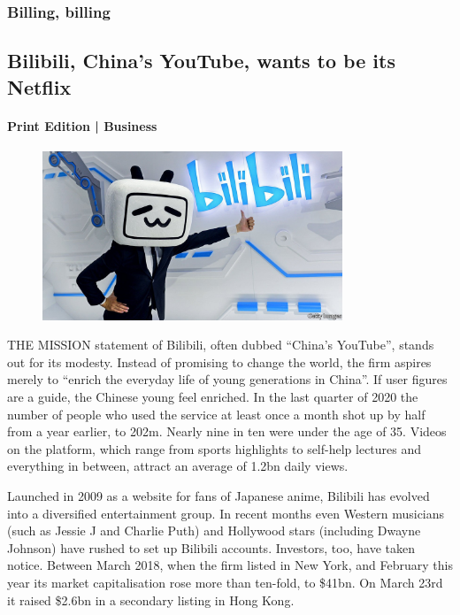 \documentclass{article}
\begin{document}
\subsubsection{Billing, billing }
\subsection{Bilibili, China's YouTube, wants to be its Netflix }
\paragraph{Print Edition | Business  \quad \color{gray}{Mar 25th 2021 }}
\begin{figure}[h]
\centering
\includegraphics[width=0.8\textwidth]{images/20210327_wbp502.jpg}
\end{figure}
\lettrine{T}HE MISSION statement of Bilibili, often dubbed ``China's YouTube'', stands out for its modesty. Instead of promising to change the world, the firm aspires merely to ``enrich the everyday life of young generations in China''. If user figures are a guide, the Chinese young feel enriched. In the last quarter of 2020 the number of people who used the service at least once a month shot up by half from a year earlier, to 202m. Nearly nine in ten were under the age of 35. Videos on the platform, which range from sports highlights to self-help lectures and everything in between, attract an average of 1.2bn daily views. 

Launched in 2009 as a website for fans of Japanese anime, Bilibili has evolved into a diversified entertainment group. In recent months even Western musicians (such as Jessie J and Charlie Puth) and Hollywood stars (including Dwayne Johnson) have rushed to set up Bilibili accounts. Investors, too, have taken notice. Between March 2018, when the firm listed in New York, and February this year its market capitalisation rose more than ten-fold, to \$41bn. On March 23rd it raised \$2.6bn in a secondary listing in Hong Kong. 
\end{document}
